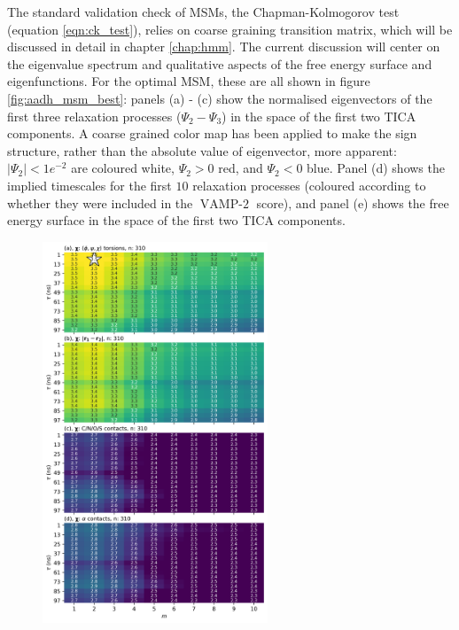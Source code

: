 The standard validation check of MSMs, the Chapman-Kolmogorov test (equation \ref{eqn:ck_test}), relies on coarse graining transition matrix, which will be discussed in detail in chapter \ref{chap:hmm}. The current discussion will center on the eigenvalue spectrum and qualitative aspects of the free energy surface and eigenfunctions. For the optimal MSM, these are all shown in figure \ref{fig:aadh_msm_best}: panels (a) - (c) show the normalised eigenvectors of the first three relaxation processes ($\Psi_{2} - \Psi_{3}$) in the space of the first two TICA components. A coarse grained color map has been applied to make the sign structure, rather than the absolute value of eigenvector, more apparent: $|\Psi_{2}| < 1e^{-2}$ are coloured white, $\Psi_{2}> 0$ red,  and $\Psi_{2} < 0$ blue. Panel (d) shows the implied timescales for the first $10$ relaxation processes (coloured according to whether they were included in the $\operatorname{VAMP-2}$ score), and panel (e) shows the free energy surface in the space of the first two TICA components. 

\begin{figure}
    \centering
    \includegraphics[width=0.6\textwidth]{chapters/msm_optimization/figures/aadh_response_surface_d_opt.png.png}
    \label{fig:aadh_rsm_opt}
\end{figure}


